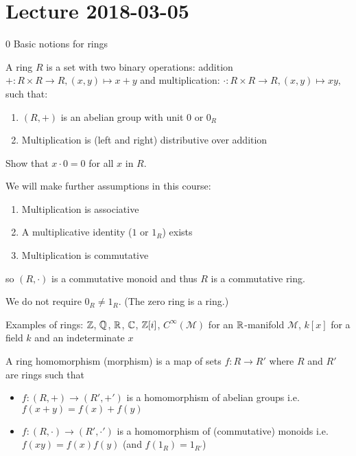 \section{Lecture 2018-03-05}

0 Basic notions for rings

\begin{defn}
	A ring $R$ is a set with two binary operations: addition $+: R \times R \to R, (x,y) \mapsto x+y$ and multiplication: $\cdot: R \times R \to R, (x,y) \mapsto xy$, such that:
	\begin{enumerate}
		\item $(R,+)$ is an abelian group with unit $0$ or $0_R$
		\item Multiplication is (left and right) distributive over addition
	\end{enumerate}
\end{defn}

\begin{exer}
	Show that $x \cdot 0 = 0$ for all $x$ in $R$.
\end{exer}

\begin{rmk}
	We will make further assumptions in this course:
	\begin{enumerate}
		\item Multiplication is associative
		\item A multiplicative identity ($1$ or $1_R$) exists
		\item Multiplication is commutative
	\end{enumerate}
	so $(R,\cdot)$ is a commutative monoid and thus $R$ is a commutative ring.
\end{rmk}

\begin{rmk}
	We do not require $0_R \neq 1_R$.
	(The zero ring is a ring.)
\end{rmk}

\begin{exam}
	Examples of rings: $\mathbb{Z}$, $\mathbb{Q}$, $\mathbb{R}$, $\mathbb{C}$, $\mathbb{Z}[i]$, $C^\infty(\mathcal{M})$ for an $\mathbb{R}$-manifold $\mathcal{M}$, $k[x]$ for a field $k$ and an indeterminate $x$
\end{exam}

\begin{defn}
	A ring homomorphism (morphism) is a map of sets $f: R \to R'$ where $R$ and $R'$ are rings such that
	\begin{itemize}
		\item $f: (R,+) \to (R',+')$ is a homomorphism of abelian groups i.e.\@ $f(x+y)=f(x)+f(y)$
		\item $f: (R,\cdot) \to (R',\cdot')$ is a homomorphism of (commutative) monoids i.e.\@ $f(xy)=f(x)f(y)$ (and $f(1_R)=1_{R'}$)
	\end{itemize}
\end{defn}

